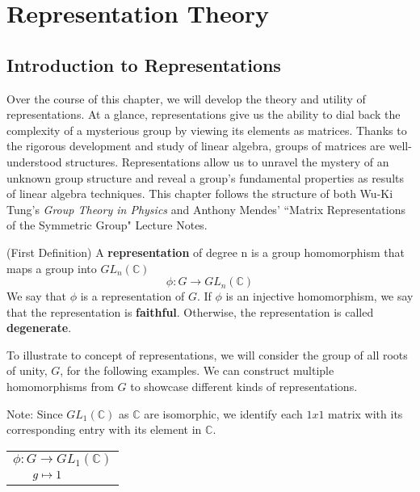 \chapter{Representation Theory}\label{rep}

\section{Introduction to Representations}

Over the course of this chapter, we will develop the theory and utility of representations. At a glance, representations give us the ability to dial back the complexity of a mysterious group by viewing its elements as matrices. Thanks to the rigorous development and study of linear algebra, groups of matrices are well-understood structures. Representations allow us to unravel the mystery of an unknown group structure and reveal a group's fundamental properties as results of linear algebra techniques. This chapter follows the structure of both Wu-Ki Tung's \textit{Group Theory in Physics} and Anthony Mendes' ``Matrix Representations of the Symmetric Group" Lecture Notes. \cite{Tung,Mendes}

\begin{definition}
	(First Definition) A \textbf{representation} of degree n is a group homomorphism that maps a group into $GL_n(\mathbb{C})$
	$$\phi:G\rightarrow GL_n(\mathbb{C})$$
	We say that $\phi$ is a representation of $G$. If $\phi$ is an injective homomorphism, we say that the representation is \textbf{faithful}. Otherwise, the representation is called \textbf{degenerate}.
\end{definition}

To illustrate to concept of representations, we will consider the group of all roots of unity, $G$, for the following examples. We can construct multiple homomorphisms from $G$ to showcase different kinds of representations. 

\noindent Note: Since $GL_1(\mathbb{C})$ as $\mathbb{C}$ are isomorphic, we identify each $1x1$ matrix with its corresponding entry with its element in $\mathbb{C}$.

\begin{example}\end{example}\renewcommand{\arraystretch}{0.7}\begin{center}
			\begin{tabular}{l}$\phi:G\rightarrow GL_1(\mathbb{C})$\\
			$\hspace{6mm}g\mapsto 1$
			\end{tabular}
		\end{center}


